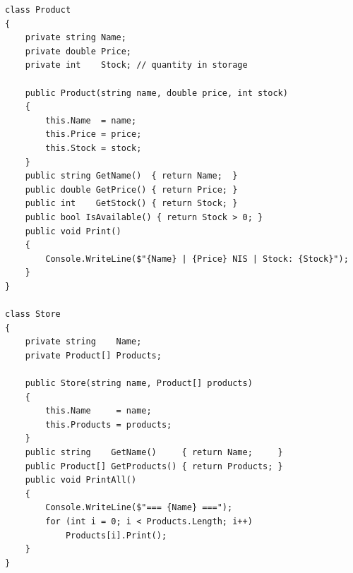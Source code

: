 \documentclass[14pt]{extarticle}
\begin{document}
\begin{boxExample}
\begin{english}
{\small
\begin{verbatim}
class Product
{
    private string Name;
    private double Price;
    private int    Stock; // quantity in storage

    public Product(string name, double price, int stock)
    {
        this.Name  = name;
        this.Price = price;
        this.Stock = stock;
    }
    public string GetName()  { return Name;  }
    public double GetPrice() { return Price; }
    public int    GetStock() { return Stock; }
    public bool IsAvailable() { return Stock > 0; }
    public void Print()
    {
        Console.WriteLine($"{Name} | {Price} NIS | Stock: {Stock}");
    }
}

class Store
{
    private string    Name;
    private Product[] Products;

    public Store(string name, Product[] products)
    {
        this.Name     = name;
        this.Products = products;
    }
    public string    GetName()     { return Name;     }
    public Product[] GetProducts() { return Products; }
    public void PrintAll()
    {
        Console.WriteLine($"=== {Name} ===");
        for (int i = 0; i < Products.Length; i++)
            Products[i].Print();
    }
}
\end{verbatim}
}
\end{english}
\end{boxExample}
\end{document}

